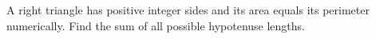 A right triangle has positive integer sides and its area equals its perimeter numerically. Find the sum of all possible hypotenuse lengths.
